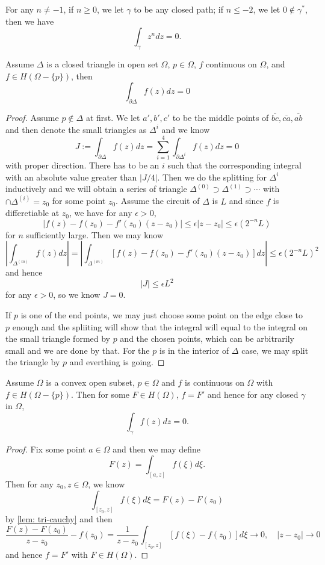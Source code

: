 \begin{corollary}
    For any $n \neq -1$, if $n\geq 0$, we let $\gamma$ to be any closed path; if $n\leq -2$, we let $0\notin\gamma^*$, then we have
    \[\int_{\gamma} z^n dz = 0.\]
\end{corollary}

\begin{lemma}
    \label{lem: tri-cauchy} Assume $\Delta$ is a closed triangle in open set $\Omega$, $p\in \Omega$, $f$ continuous on $\Omega$, and $f\in H(\Omega - \{p\})$, then
    \[
    \int_{\partial \Delta} f(z)dz = 0
    \]
\end{lemma}
\begin{proof}
    Assume $p\notin \Delta$ at first. We let $a',b',c'$ to be the middle points of $\overline{bc},\overline{ca},\overline{ab}$ and then denote the small triangles as $\Delta^i$ and we know
    \[
    J:=\int_{\partial \Delta} f(z)dz = \sum\limits_{i=1}^4 \int_{\partial \Delta^i} f(z)dz = 0
    \]
    with proper direction. There has to be an $i$ such that the corresponding integral with an absolute value greater than $|J/4|$. Then we do the splitting for $\Delta^i$ inductively and we will obtain a series of triangle $\Delta^{(0)} \supset \Delta^{(1)} \supset \cdots$ with $\cap \Delta^{(i)} = z_0$ for some point $z_0$. Assume the circuit of $\Delta$ is $L$ and since $f$ is differetiable at $z_0$, we have for any $\epsilon > 0$,
    \[
    |f(z) -f(z_0)  -f'(z_0)(z-z_0)| \leq \epsilon|z-z_0| \leq \epsilon (2^{-n}L)
    \]
    for $n$ sufficiently large. Then we may know
    \[
    \left|\int_{\Delta^{(m)}} f(z) dz\right| = \left|\int_{\Delta^{(m)}} [f(z) - f(z_0) - f'(z_0)(z-z_0)]dz\right| \leq \epsilon(2^{-n}L)^2
    \]
    and hence
    \[
    |J| \leq \epsilon L^2
    \]
    for any $\epsilon > 0$, so we know $J=0$.\par
    If $p$ is one of the end points, we may just choose some point on the edge close to $p$ enough and the spliiting will show that the integral will equal to the integral on the small triangle formed by $p$ and the chosen points, which can be arbitrarily small and we are done by that. For the $p$ is in the interior of $\Delta$ case, we may split the triangle by $p$ and everthing is going.
\end{proof}

\begin{theorem}
    \label{thm: convex-cauchy}
    Assume $\Omega$ is a convex open subset, $p \in \Omega$ and $f$ is continuous on $\Omega$ with $f\in H(\Omega - \{p\})$. Then for some $F\in H(\Omega)$, $f = F'$ and hence for any closed $\gamma$ in $\Omega$,
    \[\int_{\gamma}f(z)dz = 0.\]
\end{theorem}
\begin{proof}
    Fix some point $a \in \Omega$ and then we may define
    \[F(z) = \int_{[a,z]} f(\xi)d\xi.\]
    Then for any $z_0,z\in \Omega$, we know
    \[\int_{[z_0,z]}f(\xi)d\xi = F(z) - F(z_0)\]
    by \ref{lem: tri-cauchy} and then
    \[
    \dfrac{F(z)-F(z_0)}{z-z_0} - f(z_0) = \dfrac{1}{z-z_0}\int_{[z_0,z]}[f(\xi)-f(z_0)]d\xi  \to 0,\quad |z-z_0| \to 0
    \]
    and hence $f = F'$ with $F \in H(\Omega)$.
\end{proof}

